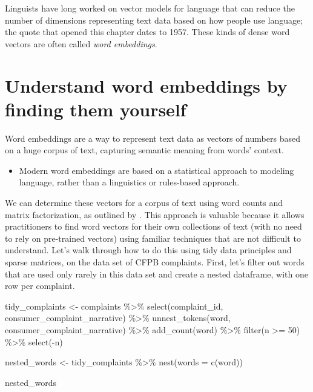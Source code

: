 \documentclass[
]{krantz}
\makeatletter
\newenvironment{Shaded}{\begin{snugshade}}{\end{snugshade}}
\newcommand{\AttributeTok}[1]{\textcolor[rgb]{0.77,0.63,0.00}{#1}}
\newcommand{\DecValTok}[1]{\textcolor[rgb]{0.00,0.00,0.81}{#1}}
\newcommand{\FunctionTok}[1]{\textcolor[rgb]{0.00,0.00,0.00}{#1}}
\newcommand{\NormalTok}[1]{#1}
\newcommand{\OtherTok}[1]{\textcolor[rgb]{0.56,0.35,0.01}{#1}}
\newcommand{\SpecialCharTok}[1]{\textcolor[rgb]{0.00,0.00,0.00}{#1}}
\newenvironment{kframe}{%
\medskip{}
\setlength{\fboxsep}{.8em}
 \def\at@end@of@kframe{}%
 \ifinner\ifhmode%
  \def\at@end@of@kframe{\end{minipage}}%
  \begin{minipage}{\columnwidth}%
 \fi\fi%
 \def\FrameCommand##1{\hskip\@totalleftmargin \hskip-\fboxsep
 \colorbox{shadecolor}{##1}\hskip-\fboxsep
     \hskip-\linewidth \hskip-\@totalleftmargin \hskip\columnwidth}%
 \MakeFramed {\advance\hsize-\width
   \@totalleftmargin\z@ \linewidth\hsize
   \@setminipage}}%
 {\par\unskip\endMakeFramed%
 \at@end@of@kframe}
\renewenvironment{Shaded}{\begin{kframe}}{\end{kframe}}
\newenvironment{rmdblock}[1]
  {\begin{shaded*}
  \begin{itemize}[left = -1cm, labelsep = 1cm]
  \renewcommand{\labelitemi}{
    \raisebox{-.7\height}[0pt][0pt]{
      {\setkeys{Gin}{width=3em,keepaspectratio}\texttt{[image: images/\#1]}}
    }
  }
 
  \item
  }
  {
  \end{itemize}
  \end{shaded*}
  }
\newenvironment{rmdnote}
  {\begin{rmdblock}{note}}
  {\end{rmdblock}}
\makeatother
\begin{document}
Linguists have long worked on vector models for language that can reduce the number of dimensions representing text data based on how people use language; the quote that opened this chapter dates to 1957. These kinds of dense word vectors are often called \emph{word embeddings}.

\hypertarget{understand-word-embeddings-by-finding-them-yourself}{%
\section{Understand word embeddings by finding them yourself}\label{understand-word-embeddings-by-finding-them-yourself}}

Word embeddings are a way to represent text data as vectors of numbers based on a huge corpus of text, capturing semantic meaning from words' context.

\begin{rmdnote}
Modern word embeddings are based on a statistical approach to modeling
language, rather than a linguistics or rules-based approach.
\end{rmdnote}

We can determine these vectors for a corpus of text using word counts and matrix factorization, as outlined by \citet{Moody2017}. This approach is valuable because it allows practitioners to find word vectors for their own collections of text (with no need to rely on pre-trained vectors) using familiar techniques that are not difficult to understand. Let's walk through how to do this using tidy data principles and sparse matrices, on the data set of CFPB complaints. First, let's filter out words that are used only rarely in this data set and create a nested dataframe, with one row per complaint.

\begin{Shaded}
\begin{Highlighting}[]
\NormalTok{tidy\_complaints }\OtherTok{\textless{}{-}}\NormalTok{ complaints }\SpecialCharTok{\%\textgreater{}\%}
  \FunctionTok{select}\NormalTok{(complaint\_id, consumer\_complaint\_narrative) }\SpecialCharTok{\%\textgreater{}\%}
  \FunctionTok{unnest\_tokens}\NormalTok{(word, consumer\_complaint\_narrative) }\SpecialCharTok{\%\textgreater{}\%}
  \FunctionTok{add\_count}\NormalTok{(word) }\SpecialCharTok{\%\textgreater{}\%}
  \FunctionTok{filter}\NormalTok{(n }\SpecialCharTok{\textgreater{}=} \DecValTok{50}\NormalTok{) }\SpecialCharTok{\%\textgreater{}\%}
  \FunctionTok{select}\NormalTok{(}\SpecialCharTok{{-}}\NormalTok{n)}

\NormalTok{nested\_words }\OtherTok{\textless{}{-}}\NormalTok{ tidy\_complaints }\SpecialCharTok{\%\textgreater{}\%}
  \FunctionTok{nest}\NormalTok{(}\AttributeTok{words =} \FunctionTok{c}\NormalTok{(word))}

\NormalTok{nested\_words}
\end{Highlighting}
\end{Shaded}
\end{document}
